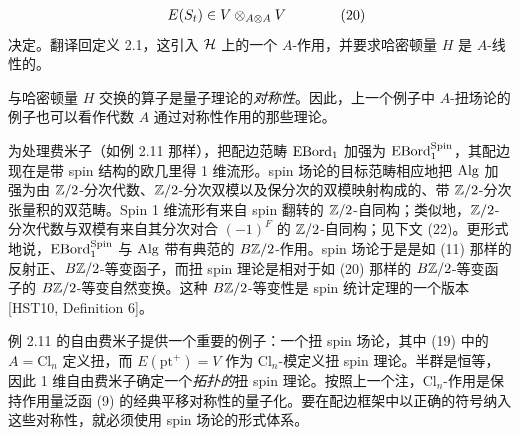 \begin{example}
\begin{equation}
\begin{array}{l}
\begin{array}{l@{\hspace{0.9em}}l}
E(S_t)\in V\otimes_{A\otimes\ol{A}}\ol{V} &
\end{array}
\end{array}
\tag{20}
\end{equation}
决定。翻译回定义 2.1，这引入 $\mathcal{H}$ 上的一个 $A$-作用，并要求哈密顿量 $H$ 是 $A$-线性的。
\end{example}

\begin{remark}[2.23]
与哈密顿量 $H$ 交换的算子是量子理论的\emph{对称性}。因此，上一个例子中 $A$-扭场论的例子也可以看作代数 $A$ 通过对称性作用的那些理论。
\end{remark}

\begin{example}[2.24（Spin 理论）]
为处理费米子（如例 2.11 那样），把配边范畴 $\operatorname{EBord}_1$ 加强为 $\operatorname{EBord}^{\mathrm{Spin}}_1$，其配边现在是带 spin 结构的欧几里得 1 维流形。spin 场论的目标范畴相应地把 $\operatorname{Alg}$ 加强为由 $\mathbb{Z}/2$-分次代数、$\mathbb{Z}/2$-分次双模以及保分次的双模映射构成的、带 $\mathbb{Z}/2$-分次张量积的双范畴。Spin 1 维流形有来自 spin 翻转的 $\mathbb{Z}/2$-自同构；类似地，$\mathbb{Z}/2$-分次代数与双模有来自其分次对合 $(-1)^{F}$ 的 $\mathbb{Z}/2$-自同构；见下文 (22)。更形式地说，$\operatorname{EBord}^{\mathrm{Spin}}_1$ 与 $\operatorname{Alg}$ 带有典范的 $B\mathbb{Z}/2$-作用。spin 场论于是是如 (11) 那样的反射正、$B\mathbb{Z}/2$-等变函子，而扭 spin 理论是相对于如 (20) 那样的 $B\mathbb{Z}/2$-等变函子的 $B\mathbb{Z}/2$-等变自然变换。这种 $B\mathbb{Z}/2$-等变性是 spin 统计定理的一个版本 [HST10, Definition 6]。

例 2.11 的自由费米子提供一个重要的例子：一个扭 spin 场论，其中 (19) 中的 $A=\mathrm{Cl}_n$ 定义扭，而 $E(\mathrm{pt}^{+})=V$ 作为 $\mathrm{Cl}_n$-模定义扭 spin 理论。半群是恒等，因此 1 维自由费米子确定一个\emph{拓扑的}扭 spin 理论。按照上一个注，$\mathrm{Cl}_n$-作用是保持作用量泛函 (9) 的经典平移对称性的量子化。要在配边框架中以正确的符号纳入这些对称性，就必须使用 spin 场论的形式体系。
\end{example}

